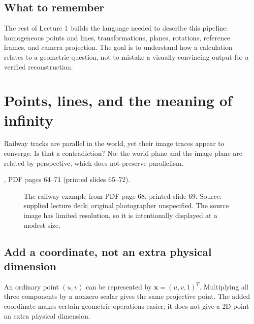 \documentclass[letterpaper,11pt,english,openany,oneside]{jupyterBook}
\begin{document}
\subsection{What to remember}
\label{\detokenize{lectures/lecture01/motivation:what-to-remember}}
\sphinxAtStartPar
The rest of Lecture 1 builds the language needed to describe this pipeline: homogeneous points and lines, transformations, planes, rotations, reference frames, and camera projection. The goal is to understand how a calculation relates to a geometric question, not to mistake a visually convincing output for a verified reconstruction.

\sphinxstepscope


\section{Points, lines, and the meaning of infinity}
\label{\detokenize{lectures/lecture01/projective:points-lines-and-the-meaning-of-infinity}}\label{\detokenize{lectures/lecture01/projective:lec01-projective}}\label{\detokenize{lectures/lecture01/projective::doc}}
\sphinxAtStartPar
Railway tracks are parallel in the world, yet their image traces appear to converge. Is that a contradiction? No: the world plane and the image plane are related by perspective, which does not preserve parallelism.

\sphinxAtStartPar
{} , PDF pages 64–71 (printed slides 65–72).

\begin{figure}[H]
\centering
\capstart

\noindent{}
\caption{The railway example from PDF page 68, printed slide 69. Source: supplied lecture deck; original photographer unspecified. The source image has limited resolution, so it is intentionally displayed at a modest size.}\label{\detokenize{lectures/lecture01/projective:fig-lec01-railway}}\end{figure}


\subsection{Add a coordinate, not an extra physical dimension}
\label{\detokenize{lectures/lecture01/projective:add-a-coordinate-not-an-extra-physical-dimension}}
\sphinxAtStartPar
An ordinary point \((u,v)\) can be represented by \(\mathbf{x}=(u,v,1)^T\). Multiplying all three components by a nonzero scalar gives the same projective point. The added coordinate makes certain geometric operations easier; it does not give a 2D point an extra physical dimension.
\end{document}
